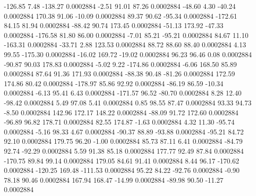      -126.85        7.48     -138.27     0.0002884
       -2.51       91.01       87.26     0.0002884
      -48.60        4.30      -40.24     0.0002884
      170.38       91.06      -10.09     0.0002884
       89.37       90.62      -95.34     0.0002884
     -172.61       84.15       81.94     0.0002884
      -88.42       90.74      173.45     0.0002884
      -51.13      173.92      -47.33     0.0002884
     -176.58       81.80       86.00     0.0002884
       -7.01       85.21      -95.21     0.0002884
       84.67       11.10     -163.31     0.0002884
      -33.71        2.88      123.53     0.0002884
       88.72       88.60       88.40     0.0002884
        4.13       99.55     -175.30     0.0002884
      -16.02      169.72      -19.02     0.0002884
       96.23       96.46        0.08     0.0002884
      -90.87       90.03      178.83     0.0002884
       -5.02        9.22     -174.86     0.0002884
       -6.06      168.50       85.89     0.0002884
       87.64       91.36      171.93     0.0002884
      -88.38       90.48      -81.26     0.0002884
      172.59      174.86       80.42     0.0002884
     -178.97       85.86       92.92     0.0002884
      -86.19       86.59      -10.34     0.0002884
       -6.13       95.41        6.43     0.0002884
     -171.57       96.52      -80.70     0.0002884
        8.28       12.40      -98.42     0.0002884
        5.49       97.08        5.41     0.0002884
        0.85       98.55       87.47     0.0002884
       93.33       94.73       -8.50     0.0002884
      142.96      172.17      148.22     0.0002884
      -88.09       91.72      172.60     0.0002884
      -96.89       96.82      178.71     0.0002884
       82.55      174.87       -1.63     0.0002884
        4.32       11.30      -95.74     0.0002884
       -5.16       98.33        4.67     0.0002884
      -90.37       88.89      -93.88     0.0002884
      -95.21       84.72       92.10     0.0002884
      179.75       96.20       -1.00     0.0002884
       85.73       87.11        6.41     0.0002884
      -84.79       92.74      -92.29     0.0002884
        5.59       91.38       85.18     0.0002884
      177.77       92.49       87.84     0.0002884
     -170.75       89.84       99.14     0.0002884
      179.05       84.61       91.41     0.0002884
        8.44       96.17     -170.62     0.0002884
     -120.25      169.48     -111.53     0.0002884
       95.22       84.22      -92.76     0.0002884
       -0.90       78.18       90.46     0.0002884
      167.94      168.47      -14.99     0.0002884
      -89.98       90.50      -11.27     0.0002884
